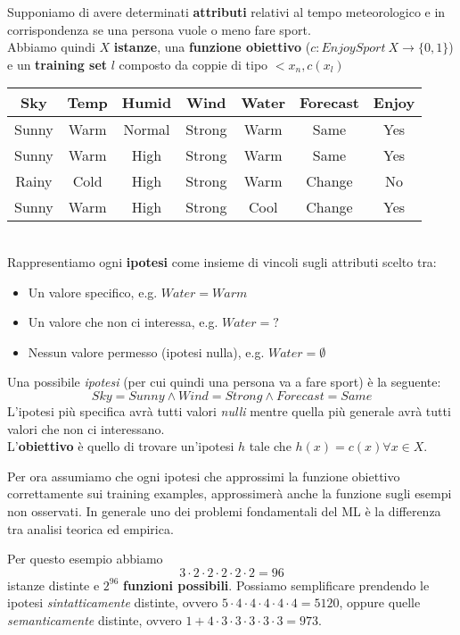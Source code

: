 \begin{example}
	\label{example:enjoy_sport}
	Supponiamo di avere determinati \textbf{attributi} relativi al tempo meteorologico e in corrispondenza se una persona vuole o meno fare sport.\\
	Abbiamo quindi $X$ \textbf{istanze}, una \textbf{funzione obiettivo} ($c:EnjoySport \: X \to \{0,1\}$) e un \textbf{training set} $l$ composto da coppie di tipo $<x_n,c(x_l)$
	\begin{table}[!h]
		\centering
		\begin{tabular}{|ccccccc|}
			\hline
			Sky & Temp & Humid & Wind & Water & Forecast & Enjoy \\
			\hline
			Sunny & Warm & Normal & Strong & Warm & Same & Yes \\
			Sunny & Warm & High & Strong & Warm & Same & Yes \\
			Rainy & Cold & High & Strong & Warm & Change & No \\
			Sunny & Warm & High & Strong & Cool & Change & Yes \\
			\hline
		\end{tabular}
	\end{table}
	\\Rappresentiamo ogni \textbf{ipotesi} come insieme di vincoli sugli attributi scelto tra:
	\begin{itemize}
		\item Un valore specifico, e.g. $Water=Warm$
		\item Un valore che non ci interessa, e.g. $Water=?$
		\item Nessun valore permesso (ipotesi nulla), e.g. $Water=\emptyset$
	\end{itemize}
	Una possibile \textit{ipotesi} (per cui quindi una persona va a fare sport) è la seguente:
	\begin{equation*}
		Sky=Sunny \land Wind=Strong \land Forecast=Same
	\end{equation*}
	L'ipotesi più specifica avrà tutti valori \textit{nulli} mentre quella più generale avrà tutti valori che non ci interessano.\\
	L'\textbf{obiettivo} è quello di trovare un'ipotesi $h$ tale che $h(x)=c(x) \forall x \in X$.
	\begin{note}
		Per ora assumiamo che ogni ipotesi che approssimi la funzione obiettivo correttamente sui training examples, approssimerà anche la funzione sugli esempi non osservati. In generale uno dei problemi fondamentali del ML è la differenza tra analisi teorica ed empirica.
	\end{note}
	Per questo esempio abbiamo
	\begin{equation*}
		3 \cdot 2 \cdot 2 \cdot 2 \cdot 2 \cdot 2 = 96
	\end{equation*}
	istanze distinte e $2^{96}$ \textbf{funzioni possibili}. Possiamo semplificare prendendo le ipotesi \textit{sintatticamente} distinte, ovvero $5\cdot 4 \cdot 4 \cdot4 \cdot 4 \cdot 4 = 5120$, oppure quelle \textit{semanticamente} distinte, ovvero $1+4\cdot3\cdot3\cdot3\cdot3\cdot3 = 973$.
\end{example}


